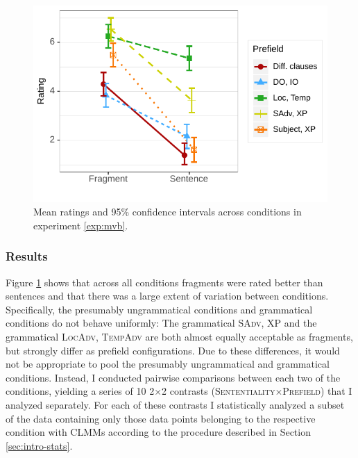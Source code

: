 \begin{figure}[t]
\includegraphics[scale=1]{figures/ex3_mvb_estimates}
 \caption{Mean ratings and 95\% confidence intervals across conditions in experiment \ref{exp:mvb}.\label{fig:mvb-estimates}}
\end{figure}

\subsubsection{Results}\label{sec:mvb-results}
Figure \ref{fig:mvb-estimates} shows that across all conditions fragments were rated better than sentences and that there was a large extent of variation between conditions. Specifically, the presumably ungrammatical conditions and grammatical conditions do not behave uniformly: The grammatical \textsc{SAdv, XP} and the grammatical \textsc{LocAdv, TempAdv} are both almost equally acceptable as fragments, but strongly differ as prefield configurations. Due to these differences, it would not be appropriate to pool the presumably ungrammatical and grammatical conditions. Instead, I conducted pairwise comparisons between each two of the conditions, yielding a series of 10 2$\times$2 contrasts (\textsc{Sententiality}$\times$\textsc{Prefield}) that I analyzed separately. For each of these contrasts I statistically analyzed a subset of the data containing only those data points belonging to the respective condition with CLMMs according to the procedure described in Section \ref{sec:intro-stats}.


